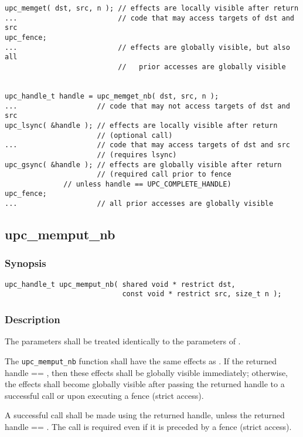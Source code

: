 \begin{verbatim}
upc_memget( dst, src, n ); // effects are locally visible after return
...                        // code that may access targets of dst and src
upc_fence;                 
...                        // effects are globally visible, but also all
                           //   prior accesses are globally visible


upc_handle_t handle = upc_memget_nb( dst, src, n );
...                   // code that may not access targets of dst and src
upc_lsync( &handle ); // effects are locally visible after return
                      // (optional call)
...                   // code that may access targets of dst and src
                      // (requires lsync)
upc_gsync( &handle ); // effects are globally visible after return
                      // (required call prior to fence
		      // unless handle == UPC_COMPLETE_HANDLE)
upc_fence;
...                   // all prior accesses are globally visible
\end{verbatim}

\newpage
\subsection{upc\_memput\_nb}
\def\function{{\tt upc\_memput\_nb}}

\subsubsection{Synopsis}

\begin{verbatim}
upc_handle_t upc_memput_nb( shared void * restrict dst,
                            const void * restrict src, size_t n );
\end{verbatim}

\subsubsection{Description}

\npf The parameters shall be treated identically to the parameters of
\memput{}.

\np The \function{} function shall have the same effects as \memput{}.
If the returned handle == \complete{}, then these effects shall be globally
visible immediately; otherwise, the effects shall become globally visible after
passing the returned handle to a successful \gsync{} call or upon executing a
fence (strict access).

\np A successful \gsync{} call shall be made using the returned handle,
unless the returned handle == \complete{}.  The call is required even if it is
preceded by a fence (strict access).


